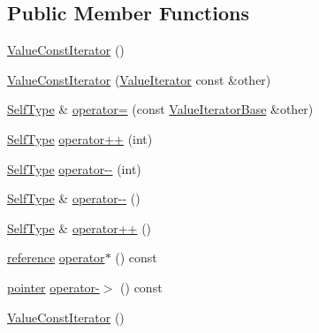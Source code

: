\subsection*{Public Member Functions}
\begin{DoxyCompactItemize}
\item 
\hyperlink{class_json_1_1_value_const_iterator_a1b10a46f1606421b0663492a5f9a2aad}{Value\+Const\+Iterator} ()
\item 
\hyperlink{class_json_1_1_value_const_iterator_a7ef3df204a9ae83a0d8a3cd128e05c70}{Value\+Const\+Iterator} (\hyperlink{class_json_1_1_value_iterator}{Value\+Iterator} const \&other)
\item 
\hyperlink{class_json_1_1_value_iterator_base_a9d2a940d03ea06d20d972f41a89149ee}{Self\+Type} \& \hyperlink{class_json_1_1_value_const_iterator_ad1b1c11f8d7fb22d4d3c231915f2b15b}{operator=} (const \hyperlink{class_json_1_1_value_iterator_base}{Value\+Iterator\+Base} \&other)
\item 
\hyperlink{class_json_1_1_value_iterator_base_a9d2a940d03ea06d20d972f41a89149ee}{Self\+Type} \hyperlink{class_json_1_1_value_const_iterator_ab3f0c2edbfc8f7d60645f3d597d05e28}{operator++} (int)
\item 
\hyperlink{class_json_1_1_value_iterator_base_a9d2a940d03ea06d20d972f41a89149ee}{Self\+Type} \hyperlink{class_json_1_1_value_const_iterator_a94935961e9331c6f7b907b05ec8df75e}{operator-\/-\/} (int)
\item 
\hyperlink{class_json_1_1_value_iterator_base_a9d2a940d03ea06d20d972f41a89149ee}{Self\+Type} \& \hyperlink{class_json_1_1_value_const_iterator_a31415e44e44e56fb2bfda7e8bb784646}{operator-\/-\/} ()
\item 
\hyperlink{class_json_1_1_value_iterator_base_a9d2a940d03ea06d20d972f41a89149ee}{Self\+Type} \& \hyperlink{class_json_1_1_value_const_iterator_a2cfe2f7a94a688186efdafb1b181c319}{operator++} ()
\item 
\hyperlink{class_json_1_1_value_const_iterator_aa9b05c6a37cd352ea1ee6e13b816f709}{reference} \hyperlink{class_json_1_1_value_const_iterator_ae5612dad47a6387eef71d584fb741d0c}{operator$\ast$} () const
\item 
\hyperlink{class_json_1_1_value_const_iterator_a400136bd8bc09e9fddec0785fa2cff14}{pointer} \hyperlink{class_json_1_1_value_const_iterator_a3c608ae53c192ee846eb265bae1cfeec}{operator-\/$>$} () const
\item 
\hyperlink{class_json_1_1_value_const_iterator_a1b10a46f1606421b0663492a5f9a2aad}{Value\+Const\+Iterator} ()
\item 

\end{DoxyCompactItemize}
